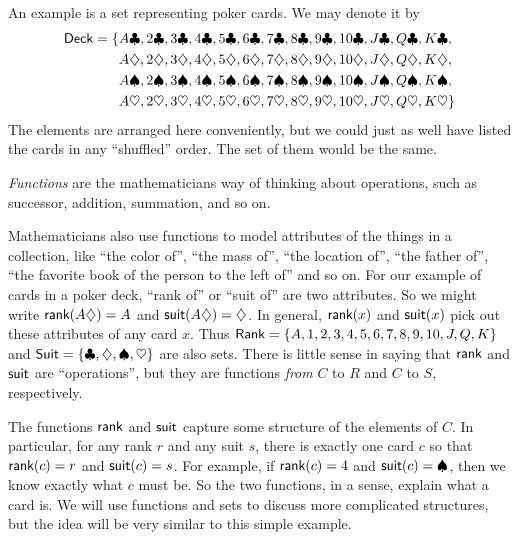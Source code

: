An example is a set representing poker cards. We may denote it by
\begin{align*}{\mathord{\textsf{Deck}}}=\{&A\clubsuit,2\clubsuit,3\clubsuit,4\clubsuit,5\clubsuit,6\clubsuit,7\clubsuit,8\clubsuit,9\clubsuit,10\clubsuit, J\clubsuit,Q\clubsuit,K\clubsuit,\\
&A\diamondsuit,2\diamondsuit,3\diamondsuit,4\diamondsuit,5\diamondsuit,6\diamondsuit,7\diamondsuit,8\diamondsuit,9\diamondsuit,10\diamondsuit, J\diamondsuit,Q\diamondsuit,K\diamondsuit,\\
&A\spadesuit,2\spadesuit,3\spadesuit,4\spadesuit,5\spadesuit,6\spadesuit,7\spadesuit,8\spadesuit,9\spadesuit,10\spadesuit, J\spadesuit,Q\spadesuit,K\spadesuit,\\
&A\heartsuit,2\heartsuit,3\heartsuit,4\heartsuit,5\heartsuit,6\heartsuit,7\heartsuit,8\heartsuit,9\heartsuit,10\heartsuit, J\heartsuit,Q\heartsuit,K\heartsuit\}
\end{align*}
The elements are arranged here conveniently, but we could just as well have listed the cards in any ``shuffled'' order. The set of them would be the same.

\emph{Functions} are the mathematicians way of thinking about operations, such as successor, addition, summation, and so on.

Mathematicians also use functions to model attributes of the things in a collection, like ``the color of'', ``the mass of'', ``the location of'', ``the father of'', ``the favorite book of the person to the left of'' and so on.
For our example of cards in a poker deck, ``rank of'' or ``suit of'' are two attributes. So we might write $\mathord{\textsf{rank}}(A\diamondsuit) = A$ and $\mathord{\textsf{suit}}(A\diamondsuit)=\diamondsuit$.
In general, $\mathord{\textsf{rank}}(x)$ and $\mathord{\textsf{suit}}(x)$ pick out these attributes of any card $x$.
Thus ${\mathord{\textsf{Rank}}} = \{A,1,2,3,4,5,6,7,8,9,10,J,Q,K\}$ 
and ${\mathord{\textsf{Suit}}} = \{\clubsuit, \diamondsuit,\spadesuit,\heartsuit\}$ are also sets.
There is little sense in saying that $\mathord{\textsf{rank}}$ and $\mathord{\textsf{suit}}$ are ``operations'', but they are functions \emph{from} $C$ to $R$ and $C$ to $S$, respectively.

The functions $\mathord{\textsf{rank}}$ and $\mathord{\textsf{suit}}$ capture some structure of the elements of $C$. In particular, for any rank $r$ and any suit $s$, there is exactly one card $c$ so that $\mathord{\textsf{rank}}(c)=r$ and $\mathord{\textsf{suit}}(c)=s$. 
For example, if $\mathord{\textsf{rank}}(c)=4$ and $\mathord{\textsf{suit}}(c)=\spadesuit$, then we know exactly what $c$ must be. So the two functions, in a sense, explain what a card is. We will use functions and sets to discuss more complicated structures, but the idea will be very similar to this simple example.

